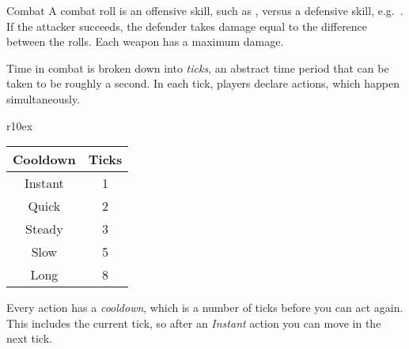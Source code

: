 
\begin{abstractsection}{Combat}
A combat roll is an offensive skill, such as , versus a defensive skill, e.g.\ . If the attacker succeeds, the defender takes damage equal to the difference between the rolls. Each weapon has a maximum damage.

Time in combat is broken down into \emph{ticks}, an abstract time period that can be taken to be roughly a second. In each tick, players declare actions, which happen simultaneously.

\begin{wraptable}[5]{r}{10ex}
  \small
\vspace*{-4ex}
\hspace*{-4.5ex}
\begin{tabular}{cc}
  Cooldown & Ticks \\
  \hline
  Instant  & 1     \\
  Quick    & 2     \\
  Steady   & 3     \\
  Slow     & 5     \\
  Long     & 8
\end{tabular}
\end{wraptable}

Every action has a \emph{cooldown}, which is a number of ticks before you can act again. This includes the current tick, so after an \emph{Instant} action you can move in the next tick.
\end{abstractsection}

